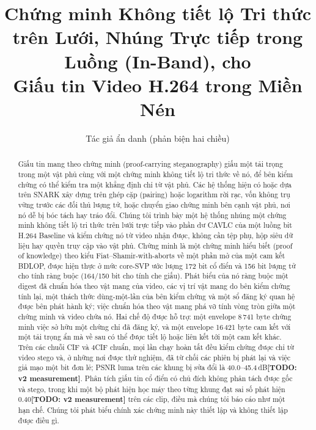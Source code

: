 \documentclass[journal]{IEEEtran}
\newcommand{\todo}[1]{\textbf{[TODO: #1]}}
\begin{document}
\title{Chứng minh Không tiết lộ Tri thức trên Lưới, Nhúng Trực tiếp trong Luồng (In-Band), cho\\ Giấu tin Video H.264 trong Miền Nén}

\author{Tác giả ẩn danh (phản biện hai chiều)}


\maketitle

\begin{abstract}
Giấu tin mang theo chứng minh (proof-carrying steganography) giấu một tải
trọng trong một vật phủ cùng với một chứng minh không tiết lộ tri thức về nó,
để bên kiểm chứng có thể kiểm tra một khẳng định chỉ từ vật phủ. Các hệ thống
hiện có hoặc dựa trên SNARK xây dựng trên ghép cặp (pairing) hoặc logarithm rời
rạc, vốn không trụ vững trước các đối thủ lượng tử, hoặc chuyển giao chứng minh
bên cạnh vật phủ, nơi nó dễ bị bóc tách hay tráo đổi. Chúng tôi trình bày một
hệ thống nhúng một chứng minh không tiết lộ tri thức trên lưới trực tiếp vào
phần dư CAVLC của một luồng bit H.264 Baseline và kiểm chứng nó từ video nhận
được, không cần tệp phụ, hộp siêu dữ liệu hay quyền truy cập vào vật phủ. Chứng
minh là một chứng minh hiểu biết (proof of knowledge) theo kiểu
Fiat--Shamir-with-aborts về một phần mở của một cam kết BDLOP, được hiện thực
ở mức core-SVP ước lượng 172 bit cổ điển và 156 bit lượng tử cho tính ràng buộc
(164/150 bit cho tính che giấu). Phát biểu của nó ràng buộc một digest đã chuẩn
hóa theo vật mang của video, các vị trí vật mang do bên kiểm chứng tính lại, một
thách thức dùng-một-lần của bên kiểm chứng và một sổ đăng ký quan hệ được bên
phát hành ký; việc chuẩn hóa theo vật mang phá vỡ tính vòng tròn giữa một chứng
minh và video chứa nó. Hai chế độ được hỗ trợ: một envelope 8\,741 byte chứng
minh việc sở hữu một chứng chỉ đã đăng ký, và một envelope 16\,421 byte cam kết
với một tải trọng ẩn mà về sau có thể được tiết lộ hoặc liên kết tới một cam kết
khác. Trên các chuỗi CIF và 4CIF chuẩn, mọi lần chạy hoàn tất đều kiểm chứng
được chỉ từ video stego và, ở những nơi được thử nghiệm, đã từ chối các phiên bị
phát lại và việc giả mạo một bit đơn lẻ; PSNR luma trên các khung bị sửa đổi là
40.0--45.4\,dB\todo{v2 measurement}. Phân tích giấu tin cổ điển có chủ đích không phân tách được
gốc và stego, trong khi một bộ phát hiện học máy theo từng khung đạt sai số phát
hiện 0.40\todo{v2 measurement} trên các clip, điều mà chúng tôi báo cáo như một hạn chế. Chúng tôi
phát biểu chính xác chứng minh này thiết lập và không thiết lập được điều gì.
\end{abstract}
\end{document}
